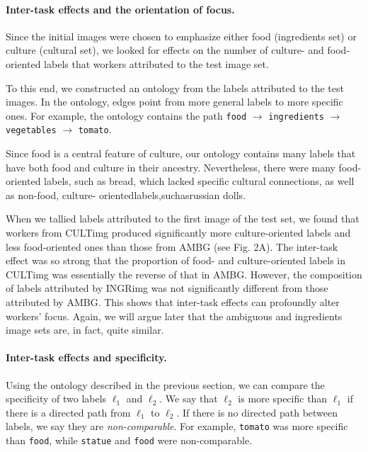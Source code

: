 \documentclass[12pt]{article}
\begin{document}
\paragraph{Inter-task effects and the orientation of focus.}
Since the initial images were chosen to emphasize either food (ingredients 
set) or culture (cultural set), we looked for effects on the number of 
culture- and food-oriented labels that workers attributed to the test image 
set.

To this end, we constructed an ontology from the labels attributed to the test 
images. In the ontology, edges point from more general labels to more 
specific ones. For example, the ontology contains the path \texttt{food} $\to$ 
\texttt{ingredients} $\to$ \texttt{vegetables} $\to$ \texttt{tomato}.

Since food is a central feature of culture, our ontology contains many labels 
that have both food and culture in their ancestry. Nevertheless, there were 
many food-oriented labels, such as bread, which lacked specific cultural 
connections, as well as non-food, culture- orientedlabels,suchasrussian dolls.

When we tallied labels attributed to the first image of the test set, we found 
that workers from CULTimg produced significantly more culture-oriented labels 
and less food-oriented ones than those from AMBG (see Fig. 2A). The inter-task 
effect was so strong that the proportion of food- and culture-oriented labels 
in CULTimg was essentially the reverse of that in AMBG. However, the 
composition of labels attributed by INGRimg was not significantly different 
from those attributed by AMBG. This shows that inter-task effects can 
profoundly alter workers' focus. Again, we will argue later that the ambiguous 
and ingredients image sets are, in fact, quite similar.

\paragraph{Inter-task effects and specificity.}
Using the ontology described in the previous section, we can compare the 
specificity of two labels $\ell_1$ and $\ell_2$. We say that $\ell_2$ is more specific 
than $\ell_1$ if there is a directed path from $\ell_1$ to $\ell_2$. If there is no 
directed path between labels, we say they are \textit{non-comparable}. For 
example, \texttt{tomato} was more specific than \texttt{food}, while 
\texttt{statue} and \texttt{food} were non-comparable.
\end{document}
